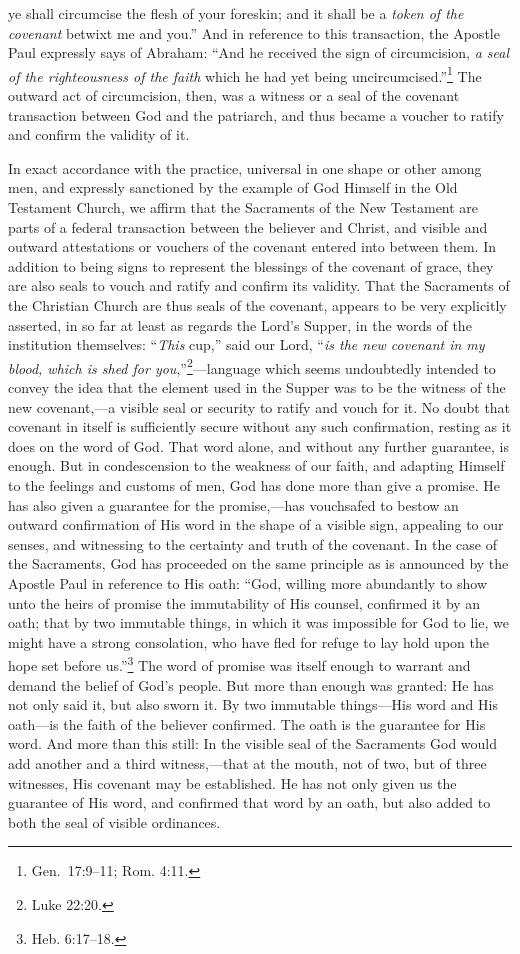 \documentclass[
]{book}
\begin{document}
ye shall circumcise the flesh of your foreskin; and it shall be a \emph{token of the covenant} betwixt me and you.'' And in reference to this transaction, the Apostle Paul expressly says of Abraham: ``And he received the sign of circumcision, \emph{a seal of the righteousness of the faith} which he had yet being uncircumcised.''\footnote{Gen.~17:9--11; Rom. 4:11.} The outward act of circumcision, then, was a witness or a seal of the covenant transaction between God and the patriarch, and thus became a voucher to ratify and confirm the validity of it.

In exact accordance with the practice, universal in one shape or other among men, and expressly sanctioned by the example of God Himself in the Old Testament Church, we affirm that the Sacraments of the New Testament are parts of a federal transaction between the believer and Christ, and visible and outward attestations or vouchers of the covenant entered into between them. In addition to being signs to represent the blessings of the covenant of grace, they are also seals to vouch and ratify and confirm its validity. That the Sacraments of the Christian Church are thus seals of the covenant, appears to be very explicitly asserted, in so far at least as regards the Lord's Supper, in the words of the institution themselves: ``\emph{This} cup,'' said our Lord, ``\emph{is the new covenant in my blood, which is shed for you},''\footnote{Luke 22:20.}---language which seems undoubtedly intended to convey the idea that the element used in the Supper was to be the witness of the new covenant,---a visible seal or security to ratify and vouch for it. No doubt that covenant in itself is sufficiently secure without any such confirmation, resting as it does on the word of God. That word alone, and without any further guarantee, is enough. But in condescension to the weakness of our faith, and adapting Himself to the feelings and customs of men, God has done more than give a promise. He has also given a guarantee for the promise,---has vouchsafed to bestow an outward confirmation of His word in the shape of a visible sign, appealing to our senses, and witnessing to the certainty and truth of the covenant. In the case of the Sacraments, God has proceeded on the same principle as is announced by the Apostle Paul in reference to His oath: ``God, willing more abundantly to show unto the heirs of promise the immutability of His counsel, confirmed it by an oath; that by two immutable things, in which it was impossible for God to lie, we might have a strong consolation, who have fled for refuge to lay hold upon the hope set before us.''\footnote{Heb. 6:17--18.} The word of promise was itself enough to warrant and demand the belief of God's people. But more than enough was granted: He has not only said it, but also sworn it. By two immutable things---His word and His oath---is the faith of the believer confirmed. The oath is the guarantee for His word. And more than this still: In the visible seal of the Sacraments God would add another and a third witness,---that at the mouth, not of two, but of three witnesses, His covenant may be established. He has not only given us the guarantee of His word, and confirmed that word by an oath, but also added to both the seal of visible ordinances. 
\end{document}
